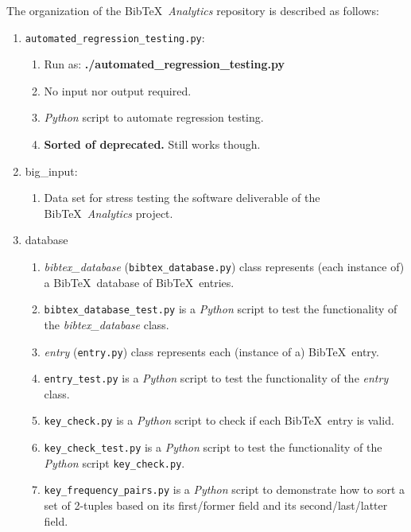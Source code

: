 The organization of the {\sc Bib}\TeX\ {\it Analytics} repository is described as follows: \vspace{-0.3cm}
\begin{enumerate} \itemsep -4pt
\item {\tt automated\_regression\_testing.py}: \vspace{-0.3cm}
	\begin{enumerate} \itemsep -2pt
	\item Run as: {\bf ./automated\_regression\_testing.py}
	\item No input nor output required.
	\item {\it Python} script to automate regression testing.
	\item {\bf Sorted of deprecated.} Still works though.
	\end{enumerate}
\item big\_input: \vspace{-0.3cm}
	\begin{enumerate} \itemsep -2pt
	\item Data set for stress testing the software deliverable of the {\sc Bib}\TeX\ {\it Analytics} project.
	\end{enumerate}
\item database \vspace{-0.3cm}
	\begin{enumerate} \itemsep -2pt
	\item {\it bibtex\_database} ({\tt bibtex\_database.py}) class represents (each instance of) a {\sc Bib}\TeX\ database of {\sc Bib}\TeX\ entries.
	\item {\tt bibtex\_database\_test.py} is a {\it Python} script to test the functionality of the {\it bibtex\_database} class.
	\item {\it entry} ({\tt entry.py}) class represents each (instance of a) {\sc Bib}\TeX\ entry.
	\item {\tt entry\_test.py} is a {\it Python} script to test the functionality of the {\it entry} class.
	\item {\tt key\_check.py} is a {\it Python} script to check if each {\sc Bib}\TeX\ entry is valid.
	\item {\tt key\_check\_test.py} is a {\it Python} script to test the functionality of the {\it Python} script {\tt key\_check.py}.
	\item {\tt key\_frequency\_pairs.py} is a {\it Python} script to demonstrate how to sort a set of 2-tuples based on its first/former field and its second/last/latter field.
	\end{enumerate}

\end{enumerate}
